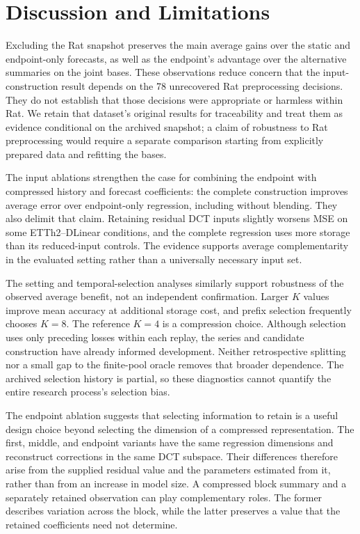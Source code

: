 \section{Discussion and Limitations}
\label{sec:discussion}

Excluding the Rat snapshot preserves the main average gains over the static and endpoint-only forecasts, as well as the endpoint's advantage over the alternative summaries on the joint bases. These observations reduce concern that the input-construction result depends on the 78 unrecovered Rat preprocessing decisions. They do not establish that those decisions were appropriate or harmless within Rat. We retain that dataset's original results for traceability and treat them as evidence conditional on the archived snapshot; a claim of robustness to Rat preprocessing would require a separate comparison starting from explicitly prepared data and refitting the bases.

The input ablations strengthen the case for combining the endpoint with compressed history and forecast coefficients: the complete construction improves average error over endpoint-only regression, including without blending. They also delimit that claim. Retaining residual DCT inputs slightly worsens MSE on some ETTh2--DLinear conditions, and the complete regression uses more storage than its reduced-input controls. The evidence supports average complementarity in the evaluated setting rather than a universally necessary input set.

The setting and temporal-selection analyses similarly support robustness of the observed average benefit, not an independent confirmation. Larger $K$ values improve mean accuracy at additional storage cost, and prefix selection frequently chooses $K=8$. The reference $K=4$ is a compression choice. Although selection uses only preceding losses within each replay, the series and candidate construction have already informed development. Neither retrospective splitting nor a small gap to the finite-pool oracle removes that broader dependence. The archived selection history is partial, so these diagnostics cannot quantify the entire research process's selection bias.

The endpoint ablation suggests that selecting information to retain is a useful design choice beyond selecting the dimension of a compressed representation. The first, middle, and endpoint variants have the same regression dimensions and reconstruct corrections in the same DCT subspace. Their differences therefore arise from the supplied residual value and the parameters estimated from it, rather than from an increase in model size. A compressed block summary and a separately retained observation can play complementary roles. The former describes variation across the block, while the latter preserves a value that the retained coefficients need not determine.

